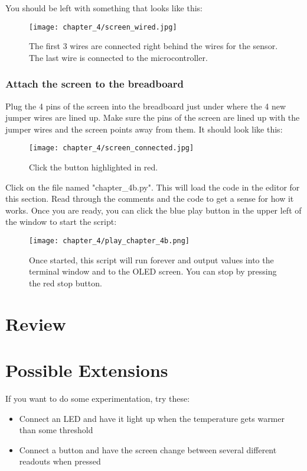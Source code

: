 You should be left with something that looks like this:
\begin{figure}[H]
    \centering
    \texttt{[image: chapter\_4/screen\_wired.jpg]}
    \caption{The first 3 wires are connected right behind the wires for the sensor. The last wire is connected to the microcontroller.}
\end{figure}

\subsubsection{Attach the screen to the breadboard}
Plug the 4 pins of the screen into the breadboard just under where the 4 new jumper wires are lined up. Make sure the pins of
the screen are lined up with the jumper wires and the screen points away from them. It should look like this:

\begin{figure}[H]
    \centering
    \texttt{[image: chapter\_4/screen\_connected.jpg]}
    \caption{Click the button highlighted in red.}
\end{figure}

Click on the file named "chapter\_4b.py". This will load the code in the editor for this section. Read through the comments and
the code to get a sense for how it works. Once you are ready, you can click the blue play button in the upper left of the window to start the script:

\begin{figure}[H]
    \centering
    \texttt{[image: chapter\_4/play\_chapter\_4b.png]}
    \caption{Once started, this script will run forever and output values into the terminal window and to the OLED screen.
    You can stop by pressing the red stop button.}
\end{figure}

\section{Review}

\section{Possible Extensions}
If you want to do some experimentation, try these:

\begin{itemize}
    \item Connect an LED and have it light up when the temperature gets warmer than some threshold
    \item Connect a button and have the screen change between several different readouts when pressed
\end{itemize}
